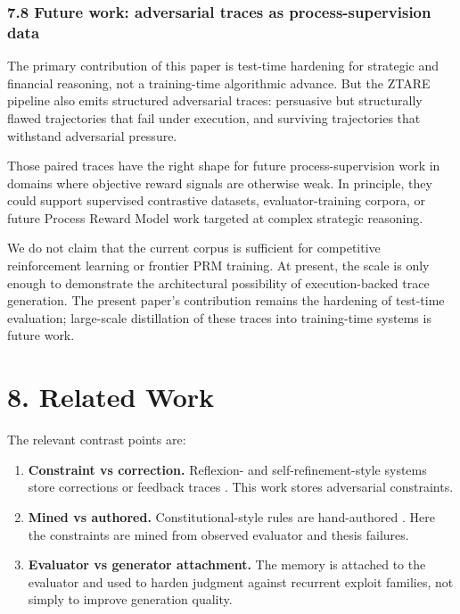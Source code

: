\documentclass[
]{article}
\providecommand{\tightlist}{%
  \setlength{\itemsep}{0pt}\setlength{\parskip}{0pt}}
\begin{document}
\subsubsection{7.8 Future work: adversarial traces as process-supervision data}\label{78-future-work-adversarial-traces-as-process-supervision-data}

The primary contribution of this paper is test-time hardening for
strategic and financial reasoning, not a training-time algorithmic
advance. But the ZTARE pipeline also emits structured adversarial
traces: persuasive but structurally flawed trajectories that fail under
execution, and surviving trajectories that withstand adversarial
pressure.

Those paired traces have the right shape for future process-supervision
work in domains where objective reward signals are otherwise weak. In
principle, they could support supervised contrastive datasets,
evaluator-training corpora, or future Process Reward Model work
targeted at complex strategic reasoning.

We do not claim that the current corpus is sufficient for competitive
reinforcement learning or frontier PRM training. At present, the scale
is only enough to demonstrate the architectural possibility of
execution-backed trace generation. The present paper's contribution
remains the hardening of test-time evaluation; large-scale distillation
of these traces into training-time systems is future work.

\section{8. Related Work}\label{8-related-work}

The relevant contrast points are:

\begin{enumerate}
\def\labelenumi{\arabic{enumi}.}
\tightlist
\item
  \textbf{Constraint vs correction.} Reflexion- and
  self-refinement-style systems store corrections or feedback traces
  \citep{shinn2023reflexion,madaan2023selfrefine}. This work stores
  adversarial constraints.
\item
  \textbf{Mined vs authored.} Constitutional-style rules are
  hand-authored \citep{bai2022constitutional}. Here the constraints are
  mined from observed evaluator and thesis failures.
\item
  \textbf{Evaluator vs generator attachment.} The memory is attached to
  the evaluator and used to harden judgment against recurrent exploit
  families, not simply to improve generation quality.
\end{enumerate}
\end{document}
